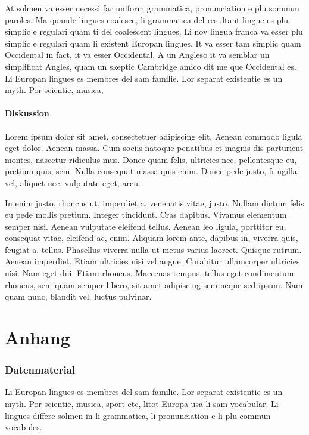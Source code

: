 \documentclass[paper=a4,fontsize=12pt,ngerman]{scrartcl}
\begin{document}
At solmen va esser necessi far uniform grammatica, pronunciation e plu sommun 
paroles. Ma quande lingues coalesce, li grammatica del resultant lingue es 
plu simplic e regulari quam ti del coalescent lingues. Li nov lingua franca 
va esser plu simplic e regulari quam li existent Europan lingues. It va esser 
tam simplic quam Occidental in fact, it va esser Occidental. A un Angleso it 
va semblar un simplificat Angles, quam un skeptic Cambridge amico dit me que 
Occidental es. Li Europan lingues es membres del sam familie. Lor separat 
existentie es un myth. Por scientie, musica,

\subsection{Diskussion}
Lorem ipsum dolor sit amet, consectetuer adipiscing elit. Aenean commodo 
ligula eget dolor. Aenean massa. Cum sociis natoque penatibus et magnis dis 
parturient montes, nascetur ridiculus mus. Donec quam felis, ultricies nec, 
pellentesque eu, pretium quis, sem. Nulla consequat massa quis enim. Donec 
pede justo, fringilla vel, aliquet nec, vulputate eget, arcu.

In enim justo, rhoncus ut, imperdiet a, venenatis vitae, justo. Nullam dictum 
felis eu pede mollis pretium. Integer tincidunt. Cras dapibus. Vivamus 
elementum semper nisi. Aenean vulputate eleifend tellus. Aenean leo ligula, 
porttitor eu, consequat vitae, eleifend ac, enim. Aliquam lorem ante, dapibus 
in, viverra quis, feugiat a, tellus. Phasellus viverra nulla ut metus varius 
laoreet. Quisque rutrum. Aenean imperdiet. Etiam ultricies nisi vel augue. 
Curabitur ullamcorper ultricies nisi. Nam eget dui. Etiam rhoncus. Maecenas 
tempus, tellus eget condimentum rhoncus, sem quam semper libero, sit amet 
adipiscing sem neque sed ipsum. Nam quam nunc, blandit vel, luctus pulvinar.

\clearpage
\renewcommand\refname{Literaturverzeichnis}




\clearpage
\appendix
\part*{Anhang}

\section{Datenmaterial}
Li Europan lingues es membres del sam familie. Lor separat existentie es un 
myth. Por scientie, musica, sport etc, litot Europa usa li sam vocabular. Li 
lingues differe solmen in li grammatica, li pronunciation e li plu commun 
vocabules.
\end{document}
